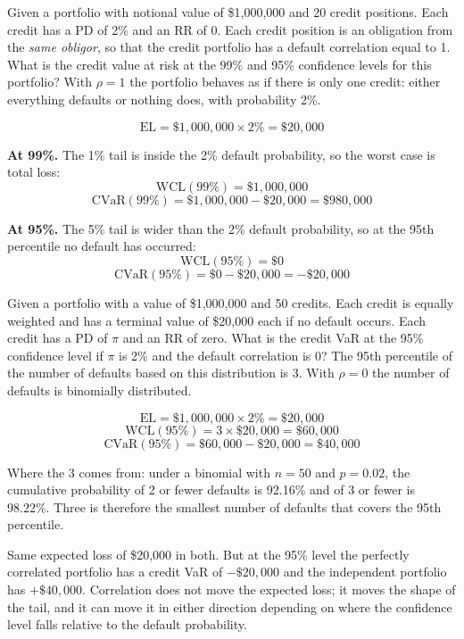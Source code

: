 \begin{crexbox}[Example 1: perfect correlation, $\rho = 1$]
Given a portfolio with notional value of \$1,000,000 and 20 credit positions.
Each credit has a PD of 2\% and an RR of 0. Each credit position is an obligation
from the \emph{same obligor}, so that the credit portfolio has a default
correlation equal to 1. What is the credit value at risk at the 99\% and 95\%
confidence levels for this portfolio?
\tcblower
With $\rho = 1$ the portfolio behaves as if there is only one credit: either
everything defaults or nothing does, with probability 2\%.

\[ \mathrm{EL} = \$1{,}000{,}000 \times 2\% = \$20{,}000 \]

\textbf{At 99\%.} The 1\% tail is inside the 2\% default probability, so the
worst case is total loss:
\[ \mathrm{WCL}(99\%) = \$1{,}000{,}000 \]
\[ \mathrm{CVaR}(99\%) = \$1{,}000{,}000 - \$20{,}000 = \$980{,}000 \]

\textbf{At 95\%.} The 5\% tail is wider than the 2\% default probability, so at
the 95th percentile no default has occurred:
\[ \mathrm{WCL}(95\%) = \$0 \]
\[ \mathrm{CVaR}(95\%) = \$0 - \$20{,}000 = -\$20{,}000 \]
\end{crexbox}

\begin{crexbox}[Example 2: zero correlation, $\rho = 0$]
Given a portfolio with a value of \$1,000,000 and 50 credits. Each credit is
equally weighted and has a terminal value of \$20,000 each if no default occurs.
Each credit has a PD of $\pi$ and an RR of zero. What is the credit VaR at the
95\% confidence level if $\pi$ is 2\% and the default correlation is 0? The 95th
percentile of the number of defaults based on this distribution is 3.
\tcblower
With $\rho = 0$ the number of defaults is binomially distributed.

\[ \mathrm{EL} = \$1{,}000{,}000 \times 2\% = \$20{,}000 \]
\[ \mathrm{WCL}(95\%) = 3 \times \$20{,}000 = \$60{,}000 \]
\[ \mathrm{CVaR}(95\%) = \$60{,}000 - \$20{,}000 = \$40{,}000 \]

\smallskip
Where the 3 comes from: under a binomial with $n=50$ and $p=0.02$, the cumulative
probability of 2 or fewer defaults is 92.16\% and of 3 or fewer is 98.22\%. Three
is therefore the smallest number of defaults that covers the 95th percentile.
\end{crexbox}

\begin{crkeybox}
Same expected loss of \$20,000 in both. But at the 95\% level the perfectly
correlated portfolio has a credit VaR of $-\$20{,}000$ and the independent
portfolio has $+\$40{,}000$. Correlation does not move the expected loss; it moves
the shape of the tail, and it can move it in either direction depending on where
the confidence level falls relative to the default probability.
\end{crkeybox}

